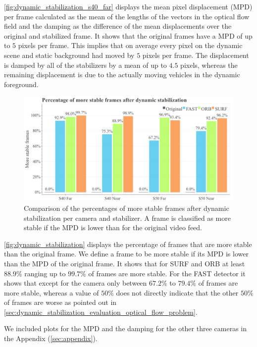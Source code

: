 \autoref{fig:dynamic_stabilization_s40_far} displays the mean pixel displacement (MPD) per frame calculated as the mean of the lengths of the vectors in the optical flow field and the damping as the difference of the mean displacements over the original and stabilized frame.
It shows that the original frames have a MPD of up to $5$ pixels per frame. This implies that on average every pixel on the dynamic scene and static background had moved by $5$ pixels per frame. 
The displacement is damped by all of the stabilizers by a mean of up to $4.5$ pixels, whereas the remaining displacement is due to the actually moving vehicles in the dynamic foreground.   

\begin{figure}[!ht]
      \includegraphics[width=\linewidth]{diagrams/optical_flow/stats.png}    
    \caption{
        Comparison of the percentages of more stable frames after dynamic stabilization per camera and stabilizer.
        A frame is classified as more stable if the MPD is lower than for the original video feed. 
    }
    \label{fig:dynamic_stabilization}
\end{figure}

\autoref{fig:dynamic_stabilization} displays the percentage of frames that are more stable than the original frame.
We define a frame to be more stable if its MPD is lower than the MPD of the original frame. 
It shows that for SURF and ORB at least $88.9\%$ ranging up to $99.7\%$ of frames are more stable.
For the FAST detector it shows that except for the  camera only between $67.2\%$ to $79.4\%$ of frames are more stable, whereas a value of $50\%$ does not directly indicate that the other $50\%$ of frames are worse as pointed out in \autoref{sec:dynamic_stabilization_evaluation_optical_flow_problem}.  

We included plots for the MPD and the damping for the other three cameras in the Appendix (\autoref{sec:appendix}).


